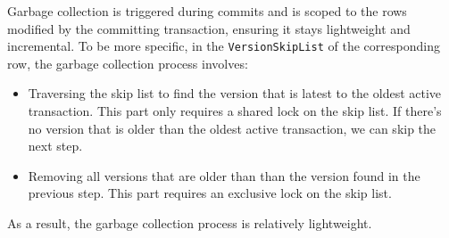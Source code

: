 \documentclass{article}
\begin{document}
Garbage collection is triggered during commits and is scoped to the rows modified by the committing transaction, ensuring it stays lightweight and incremental.
To be more specific, in the \texttt{VersionSkipList} of the corresponding row, the garbage collection process involves:
\begin{itemize}
    \item Traversing the skip list to find the version that is latest to the oldest active transaction. This part only requires a shared lock on the skip list. If there's no version that is older than the oldest active transaction, we can skip the next step.
    \item Removing all versions that are older than than the version found in the previous step. This part requires an exclusive lock on the skip list.
\end{itemize}
As a result, the garbage collection process is relatively lightweight.
\end{document}
